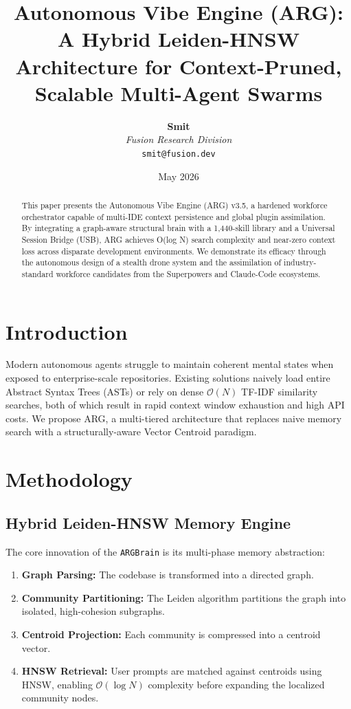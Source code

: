 \documentclass[10pt,twocolumn,letterpaper]{article}
\title{\textbf{Autonomous Vibe Engine (ARG): A Hybrid Leiden-HNSW Architecture for Context-Pruned, Scalable Multi-Agent Swarms}}
\author{
    \textbf{Smit} \\
    \textit{Fusion Research Division} \\
    \texttt{smit@fusion.dev}
}
\date{May 2026}
\begin{document}
\maketitle

\begin{abstract}
This paper presents the Autonomous Vibe Engine (ARG) v3.5, a hardened workforce orchestrator capable of multi-IDE context persistence and global plugin assimilation. By integrating a graph-aware structural brain with a 1,440-skill library and a Universal Session Bridge (USB), ARG achieves O(log N) search complexity and near-zero context loss across disparate development environments. We demonstrate its efficacy through the autonomous design of a stealth drone system and the assimilation of industry-standard workforce candidates from the Superpowers and Claude-Code ecosystems.
\end{abstract}

\section{Introduction}
Modern autonomous agents struggle to maintain coherent mental states when exposed to enterprise-scale repositories. Existing solutions naively load entire Abstract Syntax Trees (ASTs) or rely on dense $\mathcal{O}(N)$ TF-IDF similarity searches, both of which result in rapid context window exhaustion and high API costs. We propose ARG, a multi-tiered architecture that replaces naive memory search with a structurally-aware Vector Centroid paradigm.

\section{Methodology}

\subsection{Hybrid Leiden-HNSW Memory Engine}
The core innovation of the \texttt{ARGBrain} is its multi-phase memory abstraction:
\begin{enumerate}
    \item \textbf{Graph Parsing:} The codebase is transformed into a directed graph.
    \item \textbf{Community Partitioning:} The Leiden algorithm partitions the graph into isolated, high-cohesion subgraphs.
    \item \textbf{Centroid Projection:} Each community is compressed into a centroid vector.
    \item \textbf{HNSW Retrieval:} User prompts are matched against centroids using HNSW, enabling $\mathcal{O}(\log N)$ complexity before expanding the localized community nodes.
\end{enumerate}
\end{document}
